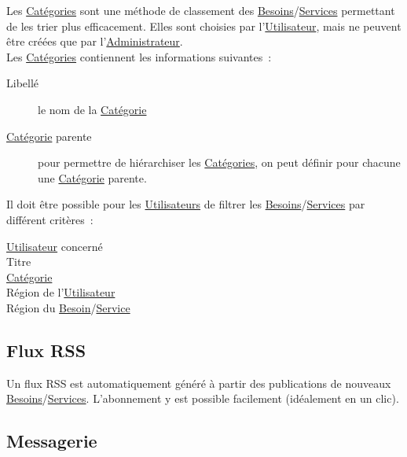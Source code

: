 \documentclass[french]{article}
\begin{document}
			Les \hyperlink{categorie}{Catégories} sont une méthode de classement des
			 \hyperlink{besoin}{Besoins}/\hyperlink{service}{Services} permettant de
			 les trier plus efficacement. Elles sont choisies par
			 l’\hyperlink{utilisateur}{Utilisateur}, mais ne peuvent être créées que
			 par l’\hyperlink{administrateur}{Administrateur}.\\
			
			Les \hyperlink{categorie}{Catégories} contiennent les informations
			suivantes :
			\begin{description}
				\item [Libellé]
					le nom de la \hyperlink{categorie}{Catégorie}
				\item [\hyperlink{categorie}{Catégorie} parente]
					pour permettre de hiérarchiser les \hyperlink{categorie}{Catégories},
					 on peut définir pour chacune une \hyperlink{categorie}{Catégorie}
					 parente.
			\end{description}
			
			Il doit être possible pour les \hyperlink{utilisateur}{Utilisateurs} de
			 filtrer les \hyperlink{besoin}{Besoins}/\hyperlink{service}{Services} par
			 différent critères :
			\begin{description}
				\item [\hyperlink{utilisateur}{Utilisateur} concerné]
				\item [Titre]
				\item [\hyperlink{categorie}{Catégorie}]
				\item [Région de l’\hyperlink{utilisateur}{Utilisateur}]
				\item [Région du \hyperlink{besoin}{Besoin}/\hyperlink{service}{Service}]
			\end{description}
			
		\newpage
		\subsection{Flux RSS}
			
			Un flux RSS est automatiquement généré à partir des publications de
			 nouveaux \hyperlink{besoin}{Besoins}/\hyperlink{service}{Services}.
			 L’abonnement y est possible facilement (idéalement en un clic).
			
		\subsection{Messagerie}
			
\end{document}

